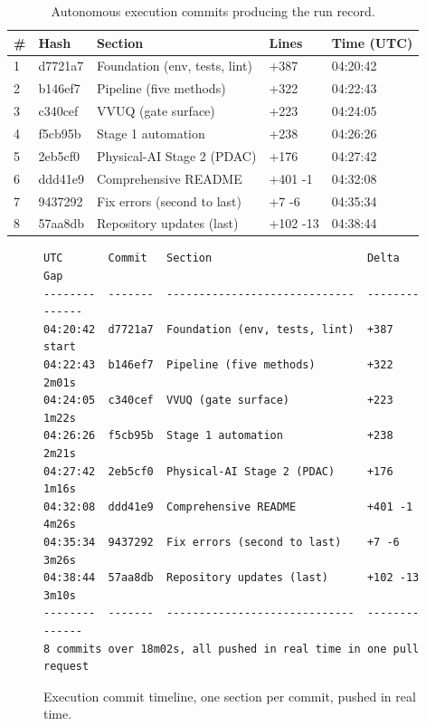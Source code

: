 \begin{table}[H]
\caption{Autonomous execution commits producing the run record.}
\label{tab:results_exec_commits}
\centering
\begin{tabularx}{\textwidth}{C{0.6cm} L{1.9cm} >{\raggedright\arraybackslash}X C{1.7cm} C{2.0cm}}
\toprule
\textbf{\#} & \textbf{Hash} & \textbf{Section} & \textbf{Lines} & \textbf{Time (UTC)} \\
 & d7721a7 & Foundation (env, tests, lint)  & +387     & 04:20:42 \\
  2 & b146ef7 & Pipeline (five methods)        & +322     & 04:22:43 \\
  3 & c340cef & VVUQ (gate surface)            & +223     & 04:24:05 \\
  4 & f5cb95b & Stage 1 automation             & +238     & 04:26:26 \\
  5 & 2eb5cf0 & Physical-AI Stage 2 (PDAC)     & +176     & 04:27:42 \\
  6 & ddd41e9 & Comprehensive README           & +401 -1  & 04:32:08 \\
  7 & 9437292 & Fix errors (second to last)    & +7 -6    & 04:35:34 \\
  8 & 57aa8db & Repository updates (last)      & +102 -13 & 04:38:44 \\
\bottomrule
\end{tabularx}
\end{table}

\begin{figure}[H]
\centering
\begin{verbatim}
UTC       Commit   Section                        Delta     Gap
--------  -------  -----------------------------  --------  ------
04:20:42  d7721a7  Foundation (env, tests, lint)  +387      start
04:22:43  b146ef7  Pipeline (five methods)        +322      2m01s
04:24:05  c340cef  VVUQ (gate surface)            +223      1m22s
04:26:26  f5cb95b  Stage 1 automation             +238      2m21s
04:27:42  2eb5cf0  Physical-AI Stage 2 (PDAC)     +176      1m16s
04:32:08  ddd41e9  Comprehensive README           +401 -1   4m26s
04:35:34  9437292  Fix errors (second to last)    +7 -6     3m26s
04:38:44  57aa8db  Repository updates (last)      +102 -13  3m10s
--------  -------  -----------------------------  --------  ------
8 commits over 18m02s, all pushed in real time in one pull request
\end{verbatim}
\vspace{-0.3cm}
\caption{Execution commit timeline, one section per commit, pushed in real time.}
\label{figtimeline}
\end{figure}

